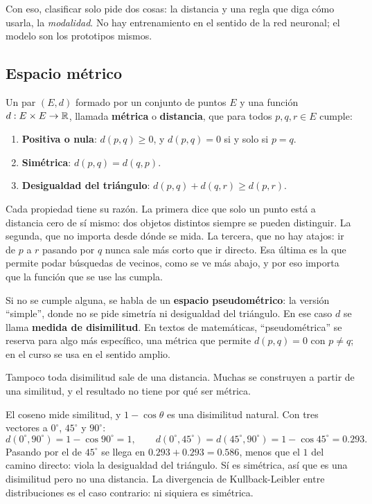 \documentclass[11pt,letterpaper]{article}
\begin{document}
Con eso, clasificar solo pide dos cosas: la distancia y una regla que
diga cómo usarla, la \emph{modalidad}. No hay entrenamiento en el
sentido de la red neuronal; el modelo son los prototipos mismos.


\subsection*{Espacio métrico}

\begin{definicion}
    Un par $(E, d)$ formado por un conjunto de puntos $E$ y una
    función $d : E \times E \to \mathbb{R}$, llamada \textbf{métrica} o
    \textbf{distancia}, que para todos $p, q, r \in E$ cumple:
    \begin{enumerate}[itemsep=0.2em]
        \item \textbf{Positiva o nula}: $d(p, q) \geq 0$, y
              $d(p, q) = 0$ si y solo si $p = q$.
        \item \textbf{Simétrica}: $d(p, q) = d(q, p)$.
        \item \textbf{Desigualdad del triángulo}:
              $d(p, q) + d(q, r) \geq d(p, r)$.
    \end{enumerate}
\end{definicion}

Cada propiedad tiene su razón. La primera dice que solo un punto está
a distancia cero de sí mismo: dos objetos distintos siempre se pueden
distinguir. La segunda, que no importa desde dónde se mida. La
tercera, que no hay atajos: ir de $p$ a $r$ pasando por $q$ nunca sale
más corto que ir directo. Esa última es la que permite podar búsquedas
de vecinos, como se ve más abajo, y por eso importa que la función que
se use las cumpla.

Si no se cumple alguna, se habla de un \textbf{espacio
pseudométrico}: la versión ``simple'', donde no se pide simetría ni
desigualdad del triángulo. En ese caso $d$ se llama \textbf{medida de
disimilitud}. En textos de matemáticas, ``pseudométrica'' se reserva
para algo más específico, una métrica que permite $d(p, q) = 0$ con
$p \neq q$; en el curso se usa en el sentido amplio.

Tampoco toda disimilitud sale de una distancia. Muchas se construyen a
partir de una similitud, y el resultado no tiene por qué ser métrica.

\begin{ejemplo}
    El coseno mide similitud, y $1 - \cos\theta$ es una disimilitud
    natural. Con tres vectores a $0^\circ$, $45^\circ$ y $90^\circ$:
    \[
        d(0^\circ, 90^\circ) = 1 - \cos 90^\circ = 1 ,
        \qquad
        d(0^\circ, 45^\circ) = d(45^\circ, 90^\circ)
        = 1 - \cos 45^\circ = 0.293 .
    \]
    Pasando por el de $45^\circ$ se llega en $0.293 + 0.293 = 0.586$,
    menos que el $1$ del camino directo: viola la desigualdad del
    triángulo. Sí es simétrica, así que es una disimilitud pero no una
    distancia. La divergencia de Kullback-Leibler entre distribuciones
    es el caso contrario: ni siquiera es simétrica.
\end{ejemplo}
\end{document}
